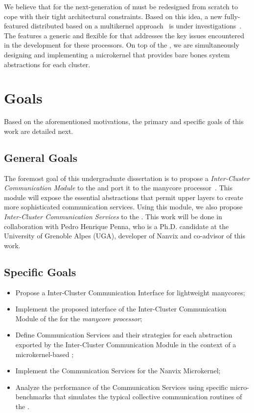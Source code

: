 	We believe that \oss for the next-generation of \lightweight \manycores must be
	redesigned from scratch to cope with their tight architectural constraints.
	Based on this idea, a new fully-featured distributed \os based on a multikernel approach~\cite{Baumann2009}
	is under investigations~\cite{penna2017-1,penna2017-2,penna2019}.
	The \nanvix \multikernel features a generic and flexible \hal for \lightweight \manycores that
	addresses the key issues encountered in the development for these processors.
	On top of the \nanvix \textit{\hal}, we are simultaneously designing and implementing a microkernel
	that provides bare bones system abstractions for each cluster.

\section{Goals}
\label{sec.goals}

	Based on the aforementioned motivations, the primary and specific goals of this work are detailed next.

\subsection{General Goals}
\label{sec.goals.general}

	The foremost goal of this undergraduate dissertation is to propose a \textit{Inter-Cluster Communication Module}
	to the \nanvix \textit{\hal} and port it to the \mppa manycore processor~\cite{DeDinechin2013-1}.
	This module will expose the essential abstractions that permit upper layers to create more
	sophisticated communication services.
	Using this module, we also propose \textit{Inter-Cluster Communication Services} to the \nanvix \microkernel.
	This work will be done in collaboration with Pedro Henrique Penna,
	who is a Ph.D. candidate at the
	University of Grenoble Alpes (UGA), developer of Nanvix and co-advisor of this work.

\subsection{Specific Goals}
\label{sec.goals.specific}

	\begin{itemize}
		\item Propose a Inter-Cluster Communication Interface for
		lightweight manycores;
		\item Implement the proposed interface of the Inter-Cluster Communication Module of the \hal 
			for the \textit{\mppa manycore processor};
		\item Define Communication Services and their strategies for each abstraction exported
			by the Inter-Cluster Communication Module in the context of a microkernel-based \os;
		\item Implement the Communication Services for the Nanvix Microkernel;
		\item Analyze the performance of the Communication Services using specific micro-benchmarks
			that simulates the typical collective communication routines of the \mpi.
	\end{itemize}

